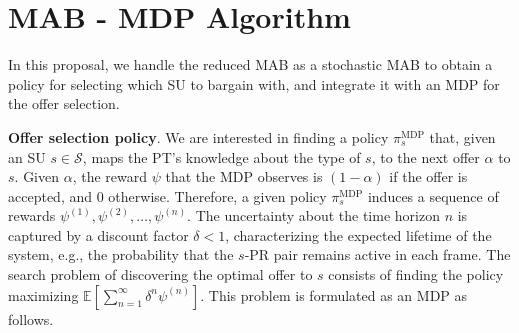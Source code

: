 


\section{MAB - MDP Algorithm}\label{sec:MAB}
In this proposal, we handle the reduced MAB as a stochastic MAB to obtain a policy for selecting which SU to bargain with, and integrate it with an MDP for the offer selection.

\textbf{Offer selection policy}.
We are interested in finding a policy $\pi_s^{\text{MDP}}$ that, given an SU $s\in\mathcal{S}$, maps the PT's knowledge about the type of $s$, to the next offer $\alpha$ to $s$.
Given $\alpha$, the reward $\psi$ that the MDP observes is $(1-\alpha)$ if the offer is accepted, and $0$ otherwise.
Therefore, a given policy $\pi_s^{\text{MDP}}$ induces a sequence of rewards $\psi^{(1)}, \psi^{(2)},\ldots,\psi^{(n)}$.
The uncertainty about the time horizon $n$ is captured by a discount factor $\delta<1$, characterizing the expected lifetime of the system, e.g., the probability that the $s$-PR pair remains active in each frame.
The search problem of discovering the optimal offer to $s$ consists of finding the policy maximizing $\mathbb{E}\left[\sum_{n=1}^{\infty}\delta^{n}\psi^{(n)}\right]$.
This problem is formulated as an MDP as follows.

